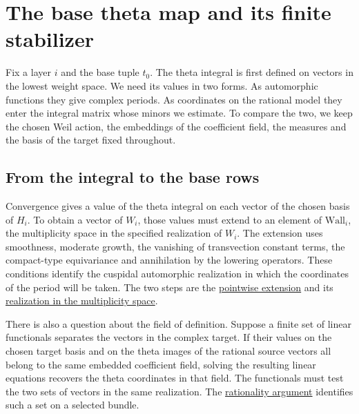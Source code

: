 \section{The base theta map and its finite stabilizer}
\label{sec:base-theta-v032}

Fix a layer $i$ and the base tuple $t_0$. The theta integral is first
defined on vectors in the lowest weight space. We need its values in
two forms. As automorphic functions they give complex periods. As
coordinates on the rational model they enter the integral matrix whose
minors we estimate. To compare the two, we keep the chosen Weil action,
the embeddings of the coefficient field, the measures and the basis of
the target fixed throughout.


\subsection*{From the integral to the base rows}

Convergence gives a value of the theta integral on each vector of the
chosen basis of $H_i$. To obtain a vector of $W_i$, those values must
extend to an element of $\mathrm{Wall}_i$, the multiplicity space in
the specified realization of $W_i$. The extension uses smoothness,
moderate growth, the vanishing of transvection constant terms, the
compact-type equivariance and annihilation by the lowering operators.
These conditions identify the cuspidal automorphic realization in
which the coordinates of the period will be taken. The two steps are
the \href{https://github.com/CocoSgt/riemann-hypothesis-lean/blob/7cbf7a0c32fca1badf05931879a37c3f8a2b03b4/src/Development/AbelianVarietyTheory/Proofs/IwasawaDecomposition/ExistsThetaLiftLinearMapCuspFormMultiplicity.lean#L180-L224}{pointwise extension}
and its \href{https://github.com/CocoSgt/riemann-hypothesis-lean/blob/7cbf7a0c32fca1badf05931879a37c3f8a2b03b4/src/Development/AbelianVarietyTheory/Proofs/IwasawaDecomposition/ExistsThetaLiftLinearMapCuspFormMultiplicity.lean#L77-L158}{realization in the multiplicity space}.

There is also a question about the field of definition. Suppose a
finite set of linear functionals separates the vectors in the complex
target. If their values on the chosen target basis and on the theta
images of the rational source vectors all belong to the same embedded
coefficient field, solving the resulting linear equations recovers the
theta coordinates in that field. The functionals must test the two
sets of vectors in the same realization. The
\hyperref[ms-manuscript-notes-theta-selected-theta-rational-tests-md]{rationality argument}
identifies such a set on a selected bundle.

